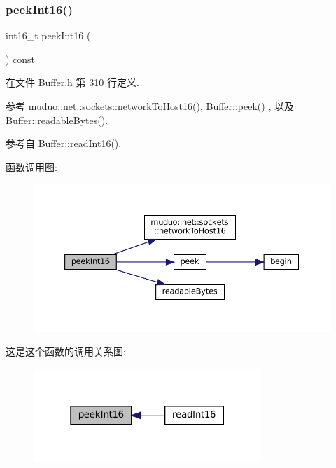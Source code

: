 \subsubsection{\texorpdfstring{peek\+Int16()}{peekInt16()}}
{\footnotesize\ttfamily int16\+\_\+t peek\+Int16 (\begin{DoxyParamCaption}{ }\end{DoxyParamCaption}) const\hspace{0.3cm}{\ttfamily [inline]}}



在文件 Buffer.\+h 第 310 行定义.



参考 muduo\+::net\+::sockets\+::network\+To\+Host16(), Buffer\+::peek() , 以及 Buffer\+::readable\+Bytes().



参考自 Buffer\+::read\+Int16().

函数调用图\+:
\nopagebreak
\begin{figure}[H]
\begin{center}
\leavevmode
\includegraphics[width=350pt]{classmuduo_1_1net_1_1Buffer_af9c96d31bad4ac1ff73d31672bc324c3_cgraph}
\end{center}
\end{figure}
这是这个函数的调用关系图\+:
\nopagebreak
\begin{figure}[H]
\begin{center}
\leavevmode
\includegraphics[width=244pt]{classmuduo_1_1net_1_1Buffer_af9c96d31bad4ac1ff73d31672bc324c3_icgraph}
\end{center}
\end{figure}
\mbox{\label{classmuduo_1_1net_1_1Buffer_afefe12caa1ed837ffb7e967d44e19af9}} 
